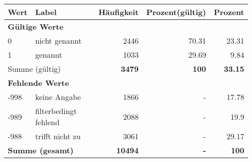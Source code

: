      \begin{longtable}{lXrrr}
     \toprule
     \textbf{Wert} & \textbf{Label} & \textbf{Häufigkeit} & \textbf{Prozent(gültig)} & \textbf{Prozent} \\
     \endhead
     \midrule
     \multicolumn{5}{l}{\textbf{Gültige Werte}}\\

     0 &
     \multicolumn{1}{X}{ nicht genannt   } &


       \num{2446} &
       \num[round-mode=places,round-precision=2]{70.31} &
         \num[round-mode=places,round-precision=2]{23.31} \\

     1 &
     \multicolumn{1}{X}{ genannt   } &


       \num{1033} &
       \num[round-mode=places,round-precision=2]{29.69} &
         \num[round-mode=places,round-precision=2]{9.84} \\
     \midrule
     \multicolumn{2}{l}{Summe (gültig)} &
       \textbf{\num{3479}} &
     \textbf{\num{100}} &
       \textbf{\num[round-mode=places,round-precision=2]{33.15}} \\
     \multicolumn{5}{l}{\textbf{Fehlende Werte}}\\
       -998 &
       keine Angabe &
         \num{1866} &
        - &
         \num[round-mode=places,round-precision=2]{17.78} \\
       -989 &
       filterbedingt fehlend &
         \num{2088} &
        - &
         \num[round-mode=places,round-precision=2]{19.9} \\
       -988 &
       trifft nicht zu &
         \num{3061} &
        - &
         \num[round-mode=places,round-precision=2]{29.17} \\
     \midrule
     \multicolumn{2}{l}{\textbf{Summe (gesamt)}} &
          \textbf{\num{10494}} &
        \textbf{-} &
        \textbf{\num{100}} \\
     \bottomrule
     \end{longtable}
     
